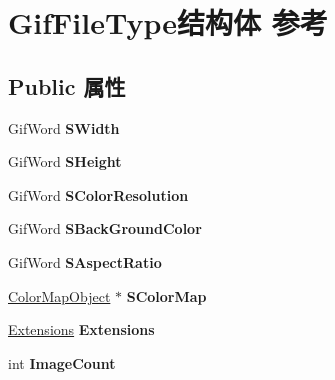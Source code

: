 \hypertarget{struct_gif_file_type}{}\section{Gif\+File\+Type结构体 参考}
\label{struct_gif_file_type}
\subsection*{Public 属性}
\begin{DoxyCompactItemize}
\item 
\mbox{\label{struct_gif_file_type_a5870f290aa0406e4751e4ce6c444465a}} 
Gif\+Word {\bfseries S\+Width}
\item 
\mbox{\label{struct_gif_file_type_ae1d30351b86372899ea8a2eff5754d97}} 
Gif\+Word {\bfseries S\+Height}
\item 
\mbox{\label{struct_gif_file_type_a778b332bc38e993ac0f477192369c56e}} 
Gif\+Word {\bfseries S\+Color\+Resolution}
\item 
\mbox{\label{struct_gif_file_type_ab555e9b486f0945f24c28d96125b6e3b}} 
Gif\+Word {\bfseries S\+Back\+Ground\+Color}
\item 
\mbox{\label{struct_gif_file_type_a3dc47ee4cbe9c1cbb2eff956cfd00c97}} 
Gif\+Word {\bfseries S\+Aspect\+Ratio}
\item 
\mbox{\label{struct_gif_file_type_a96c5d6a49231c5c3aed2941cea64c097}} 
\hyperlink{struct_color_map_object}{Color\+Map\+Object} $\ast$ {\bfseries S\+Color\+Map}
\item 
\mbox{\label{struct_gif_file_type_a408b844a5bf0c4354b74a2519d45a8fb}} 
\hyperlink{struct_extensions}{Extensions} {\bfseries Extensions}
\item 
\mbox{\label{struct_gif_file_type_aee9e6db714a03eeaeef1c2efcd79124a}} 
int {\bfseries Image\+Count}
\item 
\mbox{\label{struct_gif_file_type_a597c22974470364d26d60e288a33eef4}} 

\end{DoxyCompactItemize}
